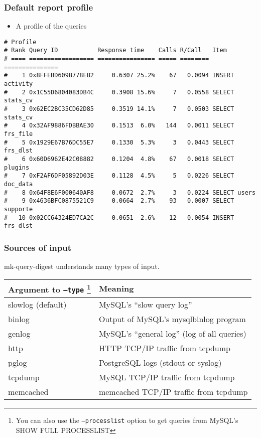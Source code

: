 \begin{frame}[fragile]
\frametitle{Default report profile}
\begin{itemize}
   \item A profile of the queries
\end{itemize}
\scriptsize
\begin{verbatim}
# Profile
# Rank Query ID           Response time    Calls R/Call   Item
# ==== ================== ================ ===== ======== ===============
#    1 0x8FFEBD609B778EB2     0.6307 25.2%    67   0.0094 INSERT activity
#    2 0x1C55D6804083DB4C     0.3908 15.6%     7   0.0558 SELECT stats_cv
#    3 0x62EC2BC35CD62D85     0.3519 14.1%     7   0.0503 SELECT stats_cv
#    4 0x32AF9886FDBBAE30     0.1513  6.0%   144   0.0011 SELECT frs_file
#    5 0x1929E67B76DC55E7     0.1330  5.3%     3   0.0443 SELECT frs_dlst
#    6 0x60D6962E42C08882     0.1204  4.8%    67   0.0018 SELECT plugins
#    7 0xF2AF6DF05892D03E     0.1128  4.5%     5   0.0226 SELECT doc_data
#    8 0x64F8E6F000640AF8     0.0672  2.7%     3   0.0224 SELECT users
#    9 0x4636BFC0875521C9     0.0664  2.7%    93   0.0007 SELECT supporte
#   10 0x02CC64324ED7CA2C     0.0651  2.6%    12   0.0054 INSERT frs_dlst
\end{verbatim}
\normalsize
\end{frame}

\begin{frame}
   \frametitle{Sources of input}
   mk-query-digest understands many types of input.
   \begin{center}
   \begin{tabular}{ll}
   Argument to \texttt{--type}
      \footnote{You can also use the \texttt{--processlist} option to get queries from MySQL's SHOW FULL PROCESSLIST}
   & Meaning \\
   \hline
   slowlog (default) & MySQL's ``slow query log'' \\
   binlog & Output of MySQL's mysqlbinlog program \\
   genlog & MySQL's ``general log'' (log of all queries) \\
   http   & HTTP TCP/IP traffic from tcpdump \\
   pglog  & PostgreSQL logs (stdout or syslog) \\
   tcpdump & MySQL TCP/IP traffic from tcpdump \\
   memcached & memcached TCP/IP traffic from tcpdump \\
   \end{tabular}
   \end{center}
\end{frame}

